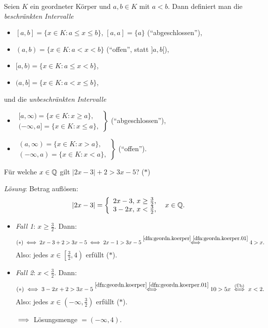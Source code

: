 \documentclass[12pt]{scrreprt}
\begin{document}
\begin{dfn}\label{dfn:abgeschl.Intervalle}
Seien $K$ ein geordneter Körper und $a, b \in K$ mit $a < b$. Dann definiert man die \textit{beschränkten Intervalle}

\begin{itemize}
\item[] $[a,b] = \{x\in K: a \leq x \leq b\}$, $[a,a] = \{a\}$ ("`abgeschlossen"'),

\item[] $(a,b) = \{x\in K: a < x < b\}$ ("`offen"', statt $]a,b[$),

\item[] $[a,b) = \{x\in K: a \leq x < b\}$,

\item[] $(a,b] = \{x\in K: a < x \leq b\}$,
\end{itemize}

und die \textit{unbeschränkten Intervalle}
\begin{itemize}
\item[] $\displaystyle\left.\begin{array}{l}[a,\infty) = \{x\in K: x\geq a\},\\(-\infty,a] = \{x\in K: x\leq a\},\end{array}\right\}$ ("`abgeschlossen"'),

\item[] $\displaystyle\left.\begin{array}{l}(a,\infty) = \{x\in K: x > a\},\\(-\infty,a) = \{x\in K: x < a\},\end{array}\right\}$ ("`offen"').
\end{itemize}
\end{dfn}

\begin{bsp*} Für welche $x\in\mathbb{Q}$ gilt $|2x-3|+2 > 3x-5$? ($\ast$)

\textit{Lösung}: Betrag auflösen:
\[|2x-3| = \left\{\begin{array}{r @{,\ } l @{,}}2x-3&x\geq\frac{3}{2}\\3-2x&x<\frac{3}{2}\end{array}\right.\quad\rat{x}.\]

\begin{itemize}
\item[]\textit{Fall 1}: $\displaystyle x \geq \frac{3}{2}$. Dann:
\[(\ast) \iff 2x - 3 + 2 > 3x - 5 \iff 2x - 1 > 3x - 5 \stackrel{\ref{dfn:geordn.koerper}~\ref{dfn:geordn.koerper.01}}{\iff} 4 > x.\]
Also: jedes $\displaystyle x\in \left[\frac{3}{2}, 4\right)$ erfüllt ($\ast$).

\item[]\textit{Fall 2}: $\displaystyle x < \frac{3}{2}$. Dann:
\[(\ast)\iff 3-2x+2 > 3x-5 \stackrel{\ref{dfn:geordn.koerper}~\ref{dfn:geordn.koerper.01}}{\iff} 10 > 5x \stackrel{\mathrm{(\ddot{U}b)}}{\iff} x < 2.\]
Also: jedes $\displaystyle x\in \left(-\infty,\frac{3}{2}\right)$ erfüllt ($\ast$).

$\implies$ Lösungsmenge $= (-\infty, 4)$.
\end{itemize}
\end{bsp*}
\end{document}
